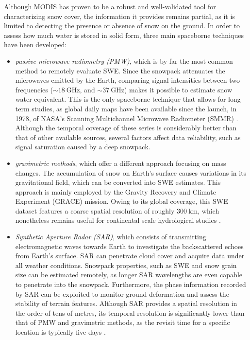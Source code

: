 Although MODIS has proven to be a robust and well-validated tool for characterizing snow cover, the information it provides remains partial, 
as it is limited to detecting the presence or absence of snow on the ground. In order to assess how much water is stored in solid form, three main 
spaceborne techniques have been developed: 
\begin{itemize}[label=$\blacktriangleright$]
    \item \textit{passive microwave radiometry (PMW)}, which is by far the most common method to remotely evaluate SWE. Since the snowpack attenuates 
    the microwaves emitted by the Earth, comparing signal intensities between two frequencies ($\sim \SI{18}{\giga\hertz}$, and $\sim \SI{37}{\giga\hertz}$) 
    makes it possible to estimate snow water equivalent. This is the only spaceborne technique that allows for long term studies, as global daily 
    maps have been available since the launch, in 1978, of NASA's Scanning Multichannel Microwave Radiometer (SMMR) \parencite{remote_SWE}. Although  
    the temporal coverage of these series is considerably better than that of other available sources, several factors affect data reliability, 
    such as signal saturation caused by a deep snowpack.
    \item \textit{gravimetric methods}, which offer a different approach focusing on mass changes. The accumulation of snow on Earth's surface 
    causes variations in its gravitational field, which can be converted into SWE estimates. This approach is mainly employed by the Gravity Recovery 
    and Climate Experiment (GRACE) mission. Owing to its global coverage, this SWE dataset features a coarse spatial resolution of roughly 
    $\SI{300}{\kilo\meter}$, which nonetheless remains useful for continental scale hydrological studies \parencite{remote_SWE}.
    \item \textit{Synthetic Aperture Radar (SAR)}, which consists of transmitting electromagnetic waves towards Earth to investigate the 
    backscattered echoes from Earth's surface. SAR can penetrate cloud cover and acquire data under all weather conditions. Snowpack properties, 
    such as SWE and snow grain size can be estimated remotely, as longer SAR wavelengths are even capable to penetrate into the snowpack. Furthermore, 
    the phase information recorded by SAR can be exploited to monitor ground deformation and assess the stability of terrain features. Although SAR 
    provides a spatial resolution in the order of tens of metres, its temporal resolution is significantly lower than that of PMW and gravimetric methods, 
    as the revisit time for a specific location is typically five days \parencite{remote_SAR}.

\end{itemize}









